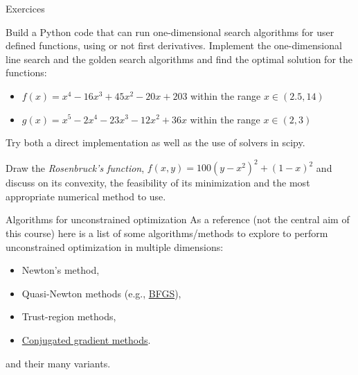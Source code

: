 \documentclass[c]{beamer}
\begin{document}
\begin{frame}[t]{Exercices}
\begin{program}
  Build a Python code that can run one-dimensional search algorithms for user defined functions, using or not first derivatives. Implement the one-dimensional line search and the golden search algorithms and find the optimal solution for the functions:
  \begin{itemize}
    \item $f(x)=x^4-16x^3+45 x^2-20x+203$ within the range $x\in(2.5,14)$
    \item $g(x)=x^5-2x^4-23x^3-12x^2+36x$ within the range $x\in(2,3)$
  \end{itemize}
  Try both a direct implementation as well as the use of solvers in scipy.
\end{program}

\begin{Exercise}
  Draw the {\em Rosenbruck's function}, $f(x,y)=100(y-x^2)^2+(1-x)^2$ and discuss on its convexity, the feasibility of its minimization and the most appropriate numerical method to use.
\end{Exercise}

\end{frame}


\begin{frame}{Algorithms for unconstrained optimization}
  As a reference (not the central aim of this course) here is a list of some algorithms/methods to explore to perform unconstrained optimization in multiple dimensions:
  \begin{itemize}
    \item Newton's method,
    \item Quasi-Newton methods (e.g., \href{https://machinelearningmastery.com/bfgs-optimization-in-python/}{BFGS}),
    \item Trust-region methods,
    \item \href{https://en.wikipedia.org/wiki/Conjugate_gradient_method}{Conjugated gradient methods}.
  \end{itemize}
  and their many variants.
\end{frame}
\end{document}
